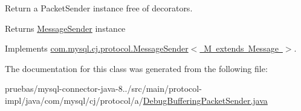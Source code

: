 Return a Packet\+Sender instance free of decorators.

\begin{DoxyReturn}{Returns}
\mbox{\hyperlink{interfacecom_1_1mysql_1_1cj_1_1protocol_1_1_message_sender}{Message\+Sender}} instance 
\end{DoxyReturn}


Implements \mbox{\hyperlink{interfacecom_1_1mysql_1_1cj_1_1protocol_1_1_message_sender_a8066931f03c2fa9cc705716fa10a4517}{com.\+mysql.\+cj.\+protocol.\+Message\+Sender$<$ M extends Message $>$}}.



The documentation for this class was generated from the following file\+:\begin{DoxyCompactItemize}
\item 
pruebas/mysql-\/connector-\/java-\/8../src/main/protocol-\/impl/java/com/mysql/cj/protocol/a/\mbox{\hyperlink{_debug_buffering_packet_sender_8java}{Debug\+Buffering\+Packet\+Sender.\+java}}\end{DoxyCompactItemize}
